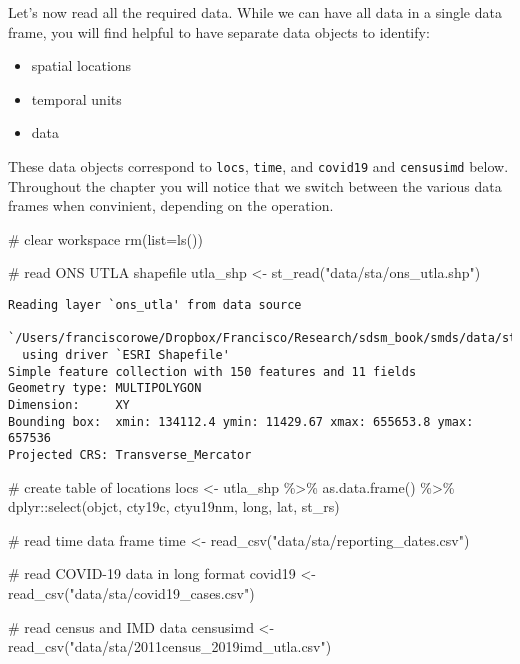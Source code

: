 \documentclass[
  letterpaper,
  krantz2]{style/krantz}
\newenvironment{Shaded}{\begin{snugshade}}{\end{snugshade}}
\newcommand{\AttributeTok}[1]{\textcolor[rgb]{0.40,0.45,0.13}{#1}}
\newcommand{\CommentTok}[1]{\textcolor[rgb]{0.37,0.37,0.37}{#1}}
\newcommand{\FunctionTok}[1]{\textcolor[rgb]{0.28,0.35,0.67}{#1}}
\newcommand{\NormalTok}[1]{\textcolor[rgb]{0.00,0.23,0.31}{#1}}
\newcommand{\OtherTok}[1]{\textcolor[rgb]{0.00,0.23,0.31}{#1}}
\newcommand{\SpecialCharTok}[1]{\textcolor[rgb]{0.37,0.37,0.37}{#1}}
\newcommand{\StringTok}[1]{\textcolor[rgb]{0.13,0.47,0.30}{#1}}
\begin{document}
Let's now read all the required data. While we can have all data in a
single data frame, you will find helpful to have separate data objects
to identify:

\begin{itemize}
\item
  spatial locations
\item
  temporal units
\item
  data
\end{itemize}

These data objects correspond to \texttt{locs}, \texttt{time}, and
\texttt{covid19} and \texttt{censusimd} below. Throughout the chapter
you will notice that we switch between the various data frames when
convinient, depending on the operation.

\begin{Shaded}
\begin{Highlighting}[]
\CommentTok{\# clear workspace}
\FunctionTok{rm}\NormalTok{(}\AttributeTok{list=}\FunctionTok{ls}\NormalTok{())}

\CommentTok{\# read ONS UTLA shapefile}
\NormalTok{utla\_shp }\OtherTok{\textless{}{-}} \FunctionTok{st\_read}\NormalTok{(}\StringTok{"data/sta/ons\_utla.shp"}\NormalTok{) }
\end{Highlighting}
\end{Shaded}

\begin{verbatim}
Reading layer `ons_utla' from data source 
  `/Users/franciscorowe/Dropbox/Francisco/Research/sdsm_book/smds/data/sta/ons_utla.shp' 
  using driver `ESRI Shapefile'
Simple feature collection with 150 features and 11 fields
Geometry type: MULTIPOLYGON
Dimension:     XY
Bounding box:  xmin: 134112.4 ymin: 11429.67 xmax: 655653.8 ymax: 657536
Projected CRS: Transverse_Mercator
\end{verbatim}

\begin{Shaded}
\begin{Highlighting}[]
\CommentTok{\# create table of locations}
\NormalTok{locs }\OtherTok{\textless{}{-}}\NormalTok{ utla\_shp }\SpecialCharTok{\%\textgreater{}\%} \FunctionTok{as.data.frame}\NormalTok{() }\SpecialCharTok{\%\textgreater{}\%}
\NormalTok{  dplyr}\SpecialCharTok{::}\FunctionTok{select}\NormalTok{(objct, cty19c, ctyu19nm, long, lat, st\_rs) }

\CommentTok{\# read time data frame}
\NormalTok{time }\OtherTok{\textless{}{-}} \FunctionTok{read\_csv}\NormalTok{(}\StringTok{"data/sta/reporting\_dates.csv"}\NormalTok{)}

\CommentTok{\# read COVID{-}19 data in long format}
\NormalTok{covid19 }\OtherTok{\textless{}{-}} \FunctionTok{read\_csv}\NormalTok{(}\StringTok{"data/sta/covid19\_cases.csv"}\NormalTok{)}

\CommentTok{\# read census and IMD data}
\NormalTok{censusimd }\OtherTok{\textless{}{-}} \FunctionTok{read\_csv}\NormalTok{(}\StringTok{"data/sta/2011census\_2019imd\_utla.csv"}\NormalTok{)}
\end{Highlighting}
\end{Shaded}
\end{document}
